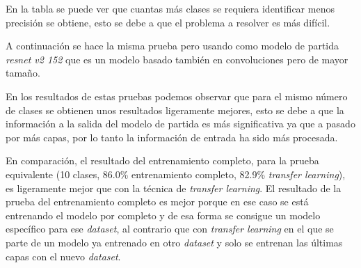 \documentclass[12pt,a4paper]{article}
\begin{document}
En la tabla se puede ver que cuantas más clases se requiera identificar menos precisión se obtiene, esto se debe a que el problema a resolver es más difícil.
\bigskip

A continuación se hace la misma prueba pero usando como modelo de partida \textit{resnet v2 152} que es un modelo basado también en convoluciones pero de mayor tamaño.

\begin{table}[H]
\centering
{}
\caption{Resultados prueba usando modelo basado en la arquitectura \textit{resnet v2 512}.}
\end{table}

En los resultados de estas pruebas podemos observar que para el mismo número de clases se obtienen unos resultados ligeramente mejores, esto se debe a que la información a la salida del modelo de partida es más significativa ya que a pasado por más capas, por lo tanto la información de entrada ha sido más procesada.
\bigskip

En comparación, el resultado del entrenamiento completo, para la prueba equivalente (10 clases, 86.0\% entrenamiento completo, 82.9\% \textit{transfer learning}), es ligeramente mejor que con la técnica de \textit{transfer learning}. El resultado de la prueba del entrenamiento completo es mejor porque en ese caso se está entrenando el modelo por completo y de esa forma se consigue un modelo específico para ese \textit{dataset}, al contrario que con \textit{transfer learning} en el que se parte de un modelo ya entrenado en otro \textit{dataset} y solo se entrenan las últimas capas con el nuevo \textit{dataset}.
\bigskip
\end{document}
